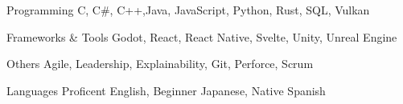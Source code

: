 

\begin{cvskills}

  \cvskill
    {Programming} %
    {C, C\#, C++,Java, JavaScript, Python, Rust, SQL, Vulkan}

  \cvskill
    {Frameworks \& Tools} %
    {Godot, React, React Native, Svelte, Unity, Unreal Engine} 

  \cvskill
    {Others} %
    {Agile, Leadership, Explainability, Git, Perforce, Scrum}

  \cvskill
    {Languages} %
    {Proficent English, Beginner Japanese, Native Spanish}

\end{cvskills}
